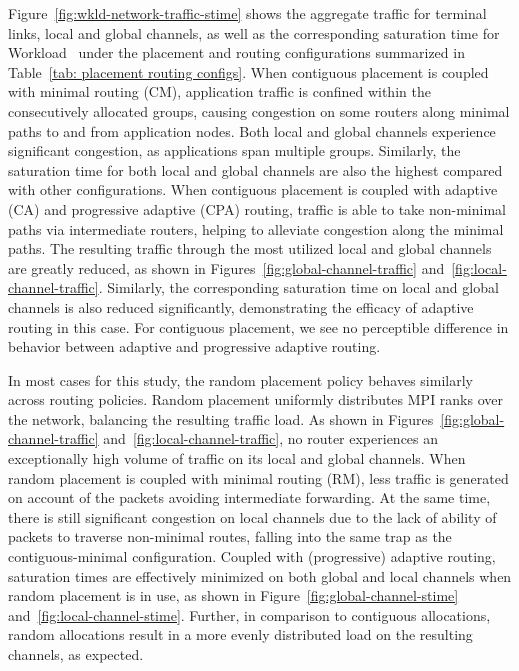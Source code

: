 Figure~\ref{fig:wkld-network-traffic-stime} shows the aggregate traffic for terminal links, local and global channels,
as well as the corresponding saturation time for Workload~ under the placement and routing configurations summarized in Table~\ref{tab: placement routing configs}.
When contiguous placement is coupled with minimal routing (CM), 
application traffic is confined within the consecutively allocated groups, 
causing congestion on some routers along minimal paths to and from application nodes. 
Both local and global channels experience significant congestion, as applications span multiple groups.
Similarly, the saturation time for both local and global channels are also the highest compared with other configurations.
When contiguous placement is coupled with adaptive (CA) and progressive adaptive (CPA) routing, 
traffic is able to take non-minimal paths via intermediate routers, helping to alleviate congestion along the minimal paths. 
The resulting traffic through the most utilized local and global channels are greatly reduced, 
as shown in Figures~\ref{fig:global-channel-traffic} and~\ref{fig:local-channel-traffic}. 
Similarly, the corresponding saturation time on local and global channels is also reduced significantly, 
demonstrating the efficacy of adaptive routing in this case. 
For contiguous placement, we see no perceptible difference in behavior between adaptive and progressive adaptive routing.


In most cases for this study, the random placement policy behaves similarly across routing policies.
Random placement uniformly distributes MPI ranks over the network, 
balancing the resulting traffic load. 
As shown in Figures~\ref{fig:global-channel-traffic} and~\ref{fig:local-channel-traffic}, 
no router experiences an exceptionally high volume of traffic on its local and global channels. 
When random placement is coupled with minimal routing (RM), less traffic is generated on account of
the packets avoiding intermediate forwarding. At the same time, there is still significant congestion on local channels due to the lack of ability of packets to traverse non-minimal routes, falling into the same trap as the contiguous-minimal configuration.
Coupled with (progressive) adaptive routing,
saturation times are effectively minimized on both global and local channels when random placement is in use, 
as shown in Figure~\ref{fig:global-channel-stime} and~\ref{fig:local-channel-stime}. Further, in comparison to contiguous allocations, random allocations result in a more evenly distributed load on the resulting channels, as expected.

